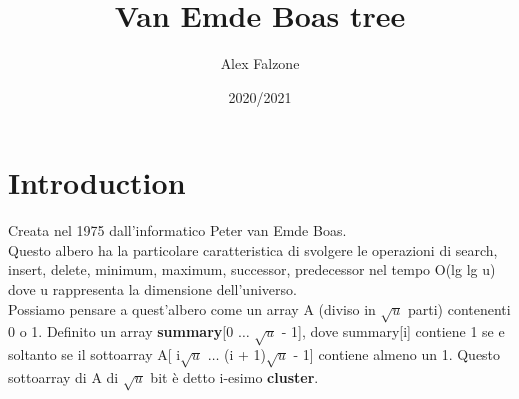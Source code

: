 \documentclass{article}
\title{\textbf{Van Emde Boas tree}}
\author{Alex Falzone }
\date{2020/2021}
\begin{document}
\maketitle

\section{Introduction}
    Creata nel 1975 dall'informatico Peter van Emde Boas.\\
    Questo albero ha la particolare caratteristica di svolgere le operazioni di search, insert, delete, minimum, maximum, successor, predecessor nel tempo O(lg lg u) dove u rappresenta la dimensione dell'universo.\\
    Possiamo pensare a quest'albero come un array A (diviso in $\sqrt{u}$ parti) contenenti 0 o 1. 
    Definito un array \textbf{summary}[0 $\dots$ $\sqrt{u}$ - 1], dove summary[i] contiene 1 se e soltanto se il sottoarray A[ i$\sqrt{u}$ $\dots$ (i + 1)$\sqrt{u}$ - 1] contiene almeno un 1. Questo sottoarray di A di $\sqrt{u}$ bit è detto i-esimo \textbf{cluster}.\\
\end{document}
